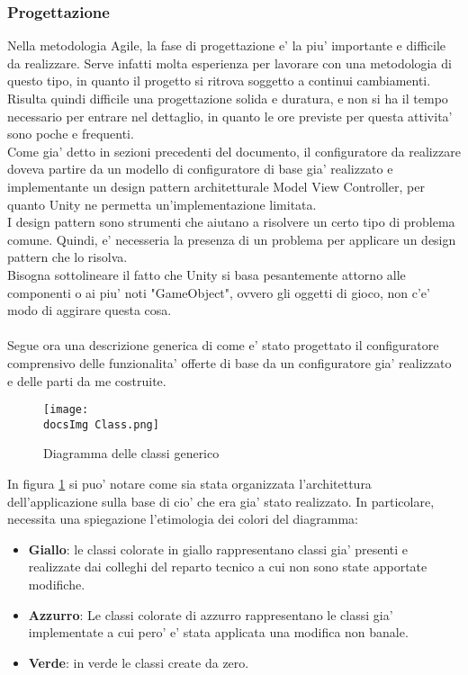 \subsubsection{Progettazione}
Nella metodologia Agile, la fase di progettazione e' la piu' importante e difficile da realizzare. Serve infatti molta esperienza per lavorare con una metodologia di questo tipo, in quanto il progetto si ritrova soggetto a continui cambiamenti. Risulta quindi difficile una progettazione solida e duratura, e non si ha il tempo necessario per entrare nel dettaglio, in quanto le ore previste per questa attivita' sono poche e frequenti.\\
Come gia' detto in sezioni precedenti del documento, il configuratore da realizzare doveva partire da un modello di configuratore di base gia' realizzato e implementante un design pattern architetturale Model View Controller, per quanto Unity ne permetta un'implementazione limitata.\\
I design pattern sono strumenti che aiutano a risolvere un certo tipo di problema comune. Quindi, e' necesseria la presenza di un problema per applicare un design pattern che lo risolva.\\
Bisogna sottolineare il fatto che Unity si basa pesantemente attorno alle componenti o ai piu' noti "GameObject", ovvero gli oggetti di gioco, non c'e' modo di aggirare questa cosa.\\\\
Segue ora una descrizione generica di come e' stato progettato il configuratore comprensivo delle funzionalita' offerte di base da un configuratore gia' realizzato e delle parti da me costruite.\\


\begin{figure}[H]
	\centering
	\texttt{[image: \\docsImg Class.png]}
	\caption{Diagramma delle classi generico}
	\label{fig:Diagramma delle classi generico}
\end{figure}
\newpage

In figura \ref{fig:Diagramma delle classi generico} si puo' notare come sia stata organizzata l'architettura dell'applicazione sulla base di cio' che era gia' stato realizzato. In particolare, necessita una spiegazione l'etimologia dei colori del diagramma:

\begin{itemize}
	\item \textbf{Giallo}: le classi colorate in giallo rappresentano classi gia' presenti e realizzate dai colleghi del reparto tecnico a cui non sono state apportate modifiche.
	\item \textbf{Azzurro}: Le classi colorate di azzurro rappresentano le classi gia' implementate a cui pero' e' stata applicata una modifica non banale.
	\item \textbf{Verde}: in verde le classi create da zero.
\end{itemize}

